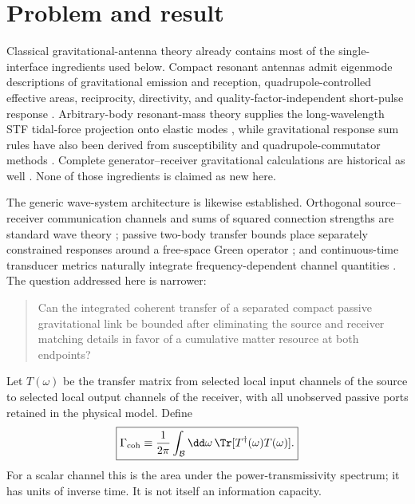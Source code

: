 \section{Problem and result}
\label{sec:context}

Classical gravitational-antenna theory already contains most of the single-interface ingredients used below. Compact resonant antennas admit eigenmode descriptions of gravitational emission and reception, quadrupole-controlled effective areas, reciprocity, directivity, and quality-factor-independent short-pulse response \cite{HirakawaNariharaFujimoto1976,PaikWagoner1976}. Arbitrary-body resonant-mass theory supplies the long-wavelength STF tidal-force projection onto elastic modes \cite{Lobo1995}, while gravitational response sum rules have also been derived from susceptibility and quadrupole-commutator methods \cite{SrivastavaWidomPizzella2003}. Complete generator--receiver gravitational calculations are historical as well \cite{GrishchukSazhin1975,Rudenko2003}. None of those ingredients is claimed as new here.

The generic wave-system architecture is likewise established. Orthogonal source--receiver communication channels and sums of squared connection strengths are standard wave theory \cite{Miller2000}; passive two-body transfer bounds place separately constrained responses around a free-space Green operator \cite{MoleskyVenkataramJinRodriguez2020}; and continuous-time transducer metrics naturally integrate frequency-dependent channel quantities \cite{WangLiJiang2022}. The question addressed here is narrower:
\begin{quote}
Can the integrated coherent transfer of a separated compact passive gravitational link be bounded after eliminating the source and receiver matching details in favor of a cumulative matter resource at both endpoints?
\end{quote}

Let $T(\omega)$ be the transfer matrix from selected local input channels of the source to selected local output channels of the receiver, with all unobserved passive ports retained in the physical model. Define
\begin{equation}
\boxed{
\Gamma_{\rm coh}
\equiv
\frac{1}{2\pi}
\int_{\mathcal B}\dd\omega\,
\Tr[T^\dagger(\omega)T(\omega)].}
\label{eq:Gammacoh}
\end{equation}
For a scalar channel this is the area under the power-transmissivity spectrum; it has units of inverse time. It is not itself an information capacity.

